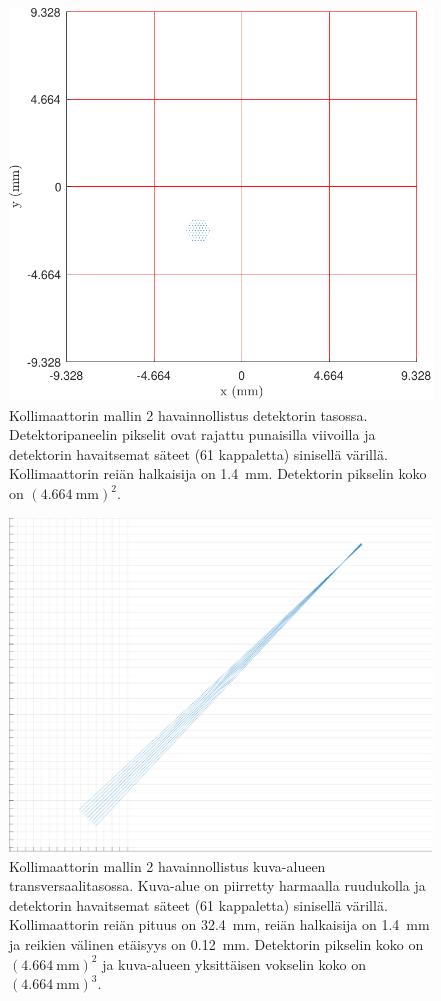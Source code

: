 \begin{figure}[H]
    \centering
    \captionsetup{width=.9\linewidth}
    \includegraphics[width=.9\linewidth]{kuvat/malli2_2D.pdf}
    \caption{Kollimaattorin mallin 2 havainnollistus detektorin tasossa. Detektoripaneelin pikselit ovat rajattu punaisilla viivoilla ja detektorin havaitsemat säteet (61 kappaletta) sinisellä värillä. Kollimaattorin reiän halkaisija on \qty{1.4}{\milli\meter}. Detektorin pikselin koko on $(\qty{4.664}{\milli\meter})^2$.}
    \label{fig:ray2_2D}
\end{figure}
\begin{figure}[H]
    \centering
    \captionsetup{width=.9\linewidth}
    \includegraphics[width=.9\linewidth]{kuvat/malli2_3D.pdf}
    \caption{Kollimaattorin mallin 2 havainnollistus kuva-alueen transversaalitasossa. Kuva-alue on piirretty harmaalla ruudukolla ja detektorin havaitsemat säteet (61 kappaletta) sinisellä värillä. Kollimaattorin reiän pituus on \qty{32.4}{\milli\meter}, reiän halkaisija on \qty{1.4}{\milli\meter} ja reikien välinen etäisyys on \qty{0.12}{\milli\meter}. Detektorin pikselin koko on $(\qty{4.664}{\milli\meter})^2$ ja kuva-alueen yksittäisen vokselin koko on $(\qty{4.664}{\milli\meter})^{3}$.}
    \label{fig:ray2_3D}
\end{figure}
